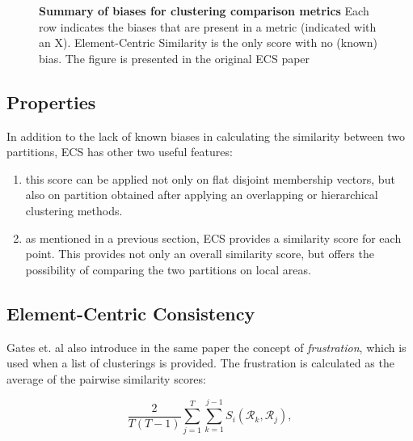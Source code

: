 \begin{figure}[H]
    \centering
    \caption{\label{fig:bias-comp}\textbf{Summary of biases for clustering comparison metrics} Each row indicates the biases that are present in a metric (indicated with an X). Element-Centric Similarity is the only score with no (known) bias. The figure is presented in the original ECS paper \cite{Gates2019}}
\end{figure}

    \subsection{Properties}
    In addition to the lack of known biases in calculating the similarity between two partitions, ECS has other two useful features:

    \begin{enumerate}
        \item this score can be applied not only on flat disjoint membership vectors, but also on partition obtained after applying an overlapping or hierarchical clustering methods.
        \item as mentioned in a previous section, ECS provides a similarity score for each point. This provides not only an overall similarity score, but offers the possibility of comparing the two partitions on local areas. 
    \end{enumerate}
    
    \subsection{Element-Centric Consistency}
    Gates et. al also introduce in the same paper the concept of \textit{frustration}, which is used when a list of clusterings is provided. The frustration is calculated as the average of the pairwise similarity scores:

    \[ \frac{2}{T(T-1)} \sum_{j=1}^T \sum_{k=1}^{j-1} S_i (\mathcal{R}_k, \mathcal{R}_j), \]

